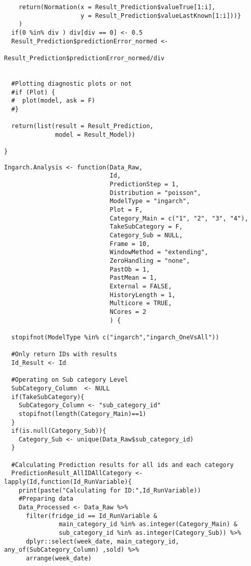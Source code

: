 \begin{verbatim}
    return(Normation(x = Result_Prediction$valueTrue[1:i],
                     y = Result_Prediction$valueLastKnown[1:i]))}
    )
  if(0 %in% div ) div[div == 0] <- 0.5
  Result_Prediction$predictionError_normed <- 
																	Result_Prediction$predictionError_normed/div
  
  
  #Plotting diagnostic plots or not
  #if (Plot) {
  #  plot(model, ask = F)
  #}
  
  return(list(result = Result_Prediction,
              model = Result_Model))
  
}
\end{verbatim}

\begin{verbatim}
Ingarch.Analysis <- function(Data_Raw,
                             Id,
                             PredictionStep = 1,
                             Distribution = "poisson",
                             ModelType = "ingarch",
                             Plot = F,
                             Category_Main = c("1", "2", "3", "4"),
                             TakeSubCategory = F,
                             Category_Sub = NULL,
                             Frame = 10,
                             WindowMethod = "extending",
                             ZeroHandling = "none",
                             PastOb = 1,
                             PastMean = 1,
                             External = FALSE,
                             HistoryLength = 1,
                             Multicore = TRUE,
                             NCores = 2
                             ) {
  
  stopifnot(ModelType %in% c("ingarch","ingarch_OneVsAll"))
  
  #Only return IDs with results
  Id_Result <- Id
  
  #Operating on Sub category Level
  SubCategory_Column  <- NULL
  if(TakeSubCategory){
    SubCategory_Column <- "sub_category_id"
    stopifnot(length(Category_Main)==1)
  }
  if(is.null(Category_Sub)){
    Category_Sub <- unique(Data_Raw$sub_category_id)
  }
  
  #Calculating Prediction results for all ids and each category
  PredictionResult_AllIDAllCategory <- lapply(Id,function(Id_RunVariable){
    print(paste("Calculating for ID:",Id_RunVariable))
    #Preparing data
    Data_Processed <- Data_Raw %>%
      filter(fridge_id == Id_RunVariable &
               main_category_id %in% as.integer(Category_Main) &
               sub_category_id %in% as.integer(Category_Sub)) %>%
      dplyr::select(week_date, main_category_id, any_of(SubCategory_Column) ,sold) %>%
      arrange(week_date)
    

\end{verbatim}
